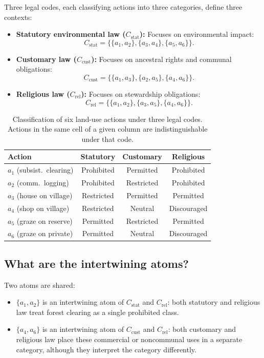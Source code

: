 \documentclass{article}
\providecommand{\colrule}{\hline}
\begin{document}
Three legal codes, each classifying actions into three categories,
define three contexts:
\begin{itemize}
\item \textbf{Statutory environmental law ($C_{\text{stat}}$):}
Focuses on environmental impact:
\[
C_{\text{stat}}=\{\{a_1,a_2\},\{a_3,a_4\},\{a_5,a_6\}\}.
\]
\item \textbf{Customary law ($C_{\text{cust}}$):}
Focuses on ancestral rights and communal obligations:
\[
C_{\text{cust}}=\{\{a_1,a_3\},\{a_2,a_5\},\{a_4,a_6\}\}.
\]
\item \textbf{Religious law ($C_{\text{rel}}$):}
Focuses on stewardship obligations:
\[
C_{\text{rel}}=\{\{a_1,a_2\},\{a_3,a_5\},\{a_4,a_6\}\}.
\]
\end{itemize}

\begin{table}[b]
\caption{\label{tab:legal}Classification of six land-use actions
under three legal codes. Actions in the same cell of a given column
are indistinguishable under that code.}
\begin{center}
\begin{tabular}{lccc}
\colrule
Action & Statutory & Customary & Religious \\
\colrule
$a_1$ (subsist.\ clearing) & Prohibited & Permitted & Prohibited \\
$a_2$ (comm.\ logging)     & Prohibited & Restricted & Prohibited \\
$a_3$ (house on village)   & Restricted & Permitted & Permitted \\
$a_4$ (shop on village)    & Restricted & Neutral & Discouraged \\
$a_5$ (graze on reserve)   & Permitted  & Restricted & Permitted \\
$a_6$ (graze on private)   & Permitted  & Neutral & Discouraged \\
\colrule
\end{tabular}
\end{center}
\end{table}

\subsection{What are the intertwining atoms?}

Two atoms are shared:
\begin{itemize}
\item $\{a_1,a_2\}$ is an intertwining atom of $C_{\text{stat}}$
and $C_{\text{rel}}$: both statutory and religious law treat forest
clearing as a single prohibited class.
\item $\{a_4,a_6\}$ is an intertwining atom of $C_{\text{cust}}$
and $C_{\text{rel}}$: both customary and religious law place these
commercial or noncommunal uses in a separate category, although they
interpret the category differently.
\end{itemize}
\end{document}
